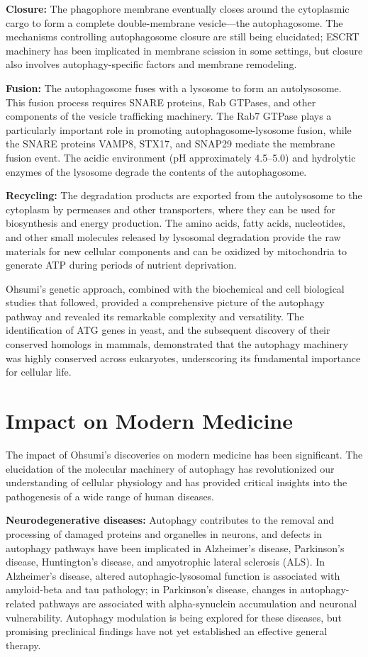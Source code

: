 \textbf{Closure:} The phagophore membrane eventually closes around the cytoplasmic cargo to form a complete double-membrane vesicle---the autophagosome. The mechanisms controlling autophagosome closure are still being elucidated; ESCRT machinery has been implicated in membrane scission in some settings, but closure also involves autophagy-specific factors and membrane remodeling.

\textbf{Fusion:} The autophagosome fuses with a lysosome to form an autolysosome. This fusion process requires SNARE proteins, Rab GTPases, and other components of the vesicle trafficking machinery. The Rab7 GTPase plays a particularly important role in promoting autophagosome-lysosome fusion, while the SNARE proteins VAMP8, STX17, and SNAP29 mediate the membrane fusion event. The acidic environment (pH approximately 4.5--5.0) and hydrolytic enzymes of the lysosome degrade the contents of the autophagosome.

\textbf{Recycling:} The degradation products are exported from the autolysosome to the cytoplasm by permeases and other transporters, where they can be used for biosynthesis and energy production. The amino acids, fatty acids, nucleotides, and other small molecules released by lysosomal degradation provide the raw materials for new cellular components and can be oxidized by mitochondria to generate ATP during periods of nutrient deprivation.

Ohsumi's genetic approach, combined with the biochemical and cell biological studies that followed, provided a comprehensive picture of the autophagy pathway and revealed its remarkable complexity and versatility. The identification of ATG genes in yeast, and the subsequent discovery of their conserved homologs in mammals, demonstrated that the autophagy machinery was highly conserved across eukaryotes, underscoring its fundamental importance for cellular life.

\section{Impact on Modern Medicine}

The impact of Ohsumi's discoveries on modern medicine has been significant. The elucidation of the molecular machinery of autophagy has revolutionized our understanding of cellular physiology and has provided critical insights into the pathogenesis of a wide range of human diseases.

\textbf{Neurodegenerative diseases:} Autophagy contributes to the removal and processing of damaged proteins and organelles in neurons, and defects in autophagy pathways have been implicated in Alzheimer's disease, Parkinson's disease, Huntington's disease, and amyotrophic lateral sclerosis (ALS). In Alzheimer's disease, altered autophagic-lysosomal function is associated with amyloid-beta and tau pathology; in Parkinson's disease, changes in autophagy-related pathways are associated with alpha-synuclein accumulation and neuronal vulnerability. Autophagy modulation is being explored for these diseases, but promising preclinical findings have not yet established an effective general therapy.

